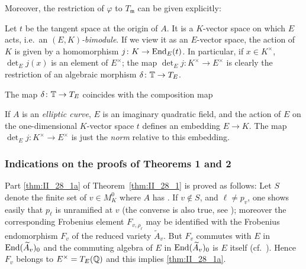 Moreover, the restriction of $\varphi$ to $T_{\mathfrak{m}}$ can be given
explicitly:

Let $t$ be the tangent space at the origin of $A$. It is a $K$-vector space on
which $E$ acts, i.e.\ an \emph{$(E, K)$-bimodule}. If we view it as an
$E$-vector space, the action of $K$ is given by a homomorphism $j\colon K \to
\operatorname{End}_E(t)$. In particular, if $x \in K^\times$, $\det_E j(x)$ is an element of
$E^\times$; the map $\det_E j\colon K^\times \to E^\times$ is clearly the
restriction of an algebraic morphism $\delta\colon \mathbb{T} \to T_E$.

\begin{thm}\label{thm:II_28_2}
The map $\delta\colon \mathbb{T} \to T_E$ coincides with the composition
map 
\end{thm}

\begin{ex}
If $A$ is an \emph{elliptic curve}, $E$ is an imaginary quadratic field, and
the action of $E$ on the one-dimensional $K$-vector space $t$ defines an
embedding $E \to K$. The map $\det_E j\colon K^\times \to E^\times$ is just the
\emph{norm} relative to this embedding.
\end{ex}

\subsubsection*{Indications on the proofs of Theorems 1 and 2}
Part \ref{thm:II_28_1a} of Theorem~\ref{thm:II_28_1} is proved as follows: Let
$S$ denote the finite set of $v \in M_K^0$ where $A$ has . If $v \notin S$, and
\dpage
$\ell \ne p_v$, one shows easily that $p_\ell$ is unramified at $v$ (the
converse is also true, see \cite{32}); moreover the corresponding Frobenius
element $F_{v, \rho_\ell}$ may be identified with the Frobenius endomorphism
$F_v$ of the reduced variety $\widetilde{A}_v$. But $F_v$ commutes with $E$ in
$\operatorname{End}(\widetilde{A}_v)_0$ and the commuting algebra of $E$ in
$\operatorname{End}(\widetilde{A}_v)_0$ is $E$ itself (cf.\ \cite[39]{34}). Hence $F_v$
belongs to $E^\times = T_E(\mathbb{Q})$ and this implies \ref{thm:II_28_1a}.

